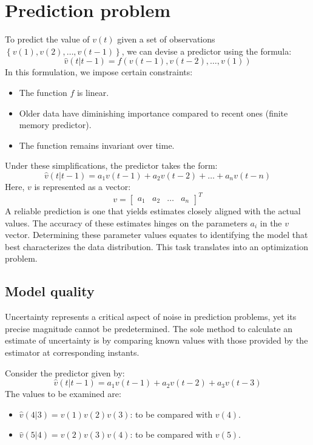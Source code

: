 \section{Prediction problem}

To predict the value of $v(t)$ given a set of observations $\left\{v(1), v(2),\dots, v(t-1)\right\}$, we can devise a predictor using the formula:
\[\widehat{v}(t | t-1)=f\left(v(t-1), v(t-2),\dots, v(1)\right)\]
In this formulation, we impose certain constraints:
\begin{itemize}
    \item The function $f$ is linear. 
    \item Older data have diminishing importance compared to recent ones (finite memory predictor).
    \item The function remains invariant over time.
\end{itemize}
Under these simplifications, the predictor takes the form:
\[\widehat{v}(t | t-1)=a_1v(t-1)+a_2v(t-2)+\dots+a_nv(t-n)\]
Here, $v$ is represented as a vector:
\[v=\begin{bmatrix} a_1 & a_2 & \dots & a_n \end{bmatrix}^T\]
A reliable prediction is one that yields estimates closely aligned with the actual values.
The accuracy of these estimates hinges on the parameters $a_i$ in the $v$ vector. 
Determining these parameter values equates to identifying the model that best characterizes the data distribution. 
This task translates into an optimization problem.

\subsection{Model quality}
Uncertainty represents a critical aspect of noise in prediction problems, yet its precise magnitude cannot be predetermined.
The sole method to calculate an estimate of uncertainty is by comparing known values with those provided by the estimator at corresponding instants.
\begin{example}
    Consider the predictor given by:
    \[\widehat{v}(t | t-1)=a_1v(t-1)+a_2v(t-2)+a_3v(t-3)\]
    The values to be examined are:
    \begin{itemize}
        \item $\widehat{v}(4 | 3)=v(1)v(2)v(3)$: to be compared with $v(4)$.
        \item $\widehat{v}(5 | 4)=v(2)v(3)v(4)$: to be compared with $v(5)$.
    \end{itemize}
\end{example}

